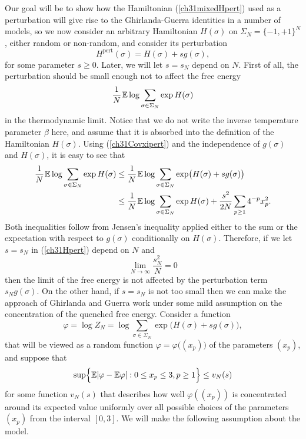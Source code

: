\documentclass[12pt]{article}
\newcommand{\smsp}{\hspace{0.3mm}}
\newcommand{\e}{\mathbb{E}}
\theoremstyle{nonumberplain}
\begin{document}
Our goal will be to show how the Hamiltonian (\ref{ch31mixedHpert}) used as a perturbation will give rise to the Ghirlanda-Guerra identities in a number of models, so we now consider an arbitrary Hamiltonian $H(\sigma)$ on $\Sigma_N = \{-1,+1\}^N$, either random or non-random, and consider its perturbation
\begin{equation}
H^{\mathrm{pert}}(\sigma) = H(\sigma) + s g(\sigma),
\label{ch31Hpert}
\end{equation} 
for some parameter $s\geq 0.$ Later, we will let $s=s_N$ depend on $N$. First of all, the perturbation should be small enough not to affect the free energy 
$$
\frac{1}{N}\smsp \e\log \sum_{\sigma\in\Sigma_N} \exp  H(\sigma)
$$
in the thermodynamic limit. Notice that we do not write the inverse temperature parameter $\beta$ here, and assume that it is absorbed into the definition of the Hamiltonian $H(\sigma)$. Using (\ref{ch31Covxipert}) and the independence of $g(\sigma)$ and $H(\sigma)$, it is easy to see that
\begin{align}
\frac{1}{N}\smsp \e\log \sum_{\sigma\in\Sigma_N} \exp  H(\sigma)
& \leq 
\frac{1}{N}\smsp \e\log \sum_{\sigma\in\Sigma_N} \exp  \bigl(H(\sigma) + s g(\sigma)\bigr)
\label{ch31FEsamepert}
\\
& \leq 
\frac{1}{N}\smsp \e\log \sum_{\sigma\in\Sigma_N} \exp  H(\sigma)
+ \frac{s^2}{2N} \sum_{p\geq 1} 4^{-p} x_p^2.
\nonumber
\end{align}
Both inequalities follow from Jensen's inequality applied either to the sum or the expectation with respect to $g(\sigma)$ conditionally on $H(\sigma)$. Therefore, if we let $s=s_N$ in (\ref{ch31Hpert}) depend on $N$ and
\begin{equation}
\lim_{N\to\infty}  \frac{s_N^2}{N} = 0
\label{ch31tN}
\end{equation} 
then the limit of the free energy is not affected by the perturbation term $s_N g(\sigma).$ On the other hand, if $s=s_N$ is not too small then we can make the approach of Ghirlanda and Guerra work under some mild assumption on the concentration of the quenched free energy. Consider a  function
\begin{equation}
\varphi = \log Z_N =
\log \sum_{\sigma\in\Sigma_N} \exp \bigl(H(\sigma) + s g(\sigma)\bigr),
\label{ch31theta}
\end{equation}
that will be viewed as a random function $\varphi = \varphi\bigl((x_p)\bigr)$ of the parameters $(x_p)$, and suppose that
\begin{equation}
\sup\Bigl\{ \e |\varphi - \e \varphi | : 0\leq x_p\leq 3, p\geq 1\Bigr\}\leq v_N(s)
\label{ch31vt}
\end{equation}
for some function $v_N(s)$ that describes how well $\varphi((x_p))$ is concentrated around its expected value uniformly over all possible choices of the parameters $(x_p)$ from the interval $[0,3].$ We will make the following assumption about the model.
\end{document}
